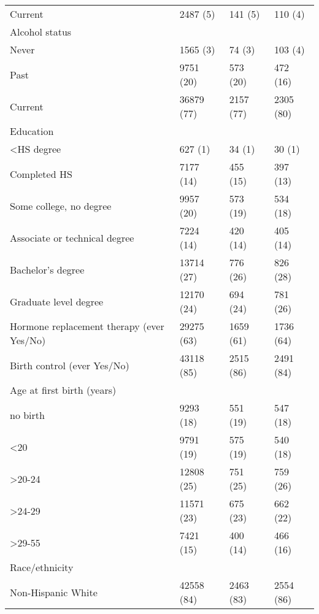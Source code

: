\documentclass[
]{article}
\begin{document}
\begin{longtable}[t]{llll}
\hspace{1em}Current & 2487 (5) & 141 (5) & 110 (4)\\
Alcohol status &  &  & \\
\hspace{1em}Never & 1565 (3) & 74 (3) & 103 (4)\\
\hspace{1em}Past & 9751 (20) & 573 (20) & 472 (16)\\
\hspace{1em}Current & 36879 (77) & 2157 (77) & 2305 (80)\\
Education &  &  & \\
\hspace{1em}<HS degree & 627 (1) & 34 (1) & 30 (1)\\
\hspace{1em}Completed HS & 7177 (14) & 455 (15) & 397 (13)\\
\hspace{1em}Some college, no degree & 9957 (20) & 573 (19) & 534 (18)\\
\hspace{1em}Associate or technical degree & 7224 (14) & 420 (14) & 405 (14)\\
\hspace{1em}Bachelor's degree & 13714 (27) & 776 (26) & 826 (28)\\
\hspace{1em}Graduate level degree & 12170 (24) & 694 (24) & 781 (26)\\
Hormone replacement therapy (ever Yes/No) & 29275 (63) & 1659 (61) & 1736 (64)\\
Birth control (ever Yes/No) & 43118 (85) & 2515 (86) & 2491 (84)\\
Age at first birth (years) &  &  & \\
no birth & 9293 (18) & 551 (19) & 547 (18)\\
\hspace{1em}<20 & 9791 (19) & 575 (19) & 540 (18)\\
\hspace{1em}>20-24 & 12808 (25) & 751 (25) & 759 (26)\\
\hspace{1em}>24-29 & 11571 (23) & 675 (23) & 662 (22)\\
\hspace{1em}>29-55 & 7421 (15) & 400 (14) & 466 (16)\\
\hspace{1em}Race/ethnicity &  &  & \\
\hspace{1em}Non-Hispanic White & 42558 (84) & 2463 (83) & 2554 (86)\\

\end{longtable}
\end{document}
